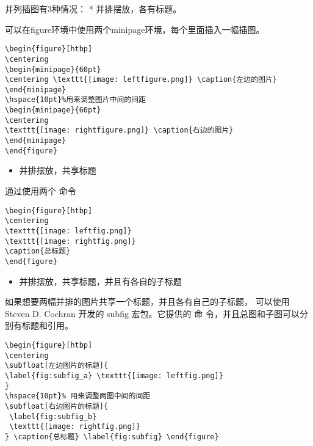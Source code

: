 
并列插图有3种情况： * 并排摆放，各有标题。

可以在figure环境中使用两个minipage环境，每个里面插入一幅插图。

\begin{verbatim}
\begin{figure}[htbp]
\centering
\begin{minipage}{60pt}
\centering \texttt{[image: leftfigure.png]} \caption{左边的图片}
\end{minipage}
\hspace{10pt}%用来调整图片中间的间距
\begin{minipage}{60pt}
\centering
\texttt{[image: rightfigure.png]} \caption{右边的图片}
\end{minipage}
\end{figure}
\end{verbatim}

\begin{itemize}

\item
  并排摆放，共享标题
\end{itemize}

通过使用两个  命令

\begin{verbatim}
\begin{figure}[htbp]
\centering
\texttt{[image: leftfig.png]}
\texttt{[image: rightfig.png]}
\caption{总标题}
\end{figure}
\end{verbatim}

\begin{itemize}

\item
  并排摆放，共享标题，并且有各自的子标题
\end{itemize}

如果想要两幅并排的图片共享一个标题，并且各有自己的子标题， 可以使用
Steven D. Cochran 开发的 subfig 宏包。它提供的  命
令，并且总图和子图可以分别有标题和引用。

\begin{verbatim}
\begin{figure}[htbp]
\centering
\subfloat[左边图片的标题]{
\label{fig:subfig_a} \texttt{[image: leftfig.png]}
}
\hspace{10pt}% 用来调整两图中间的间距
\subfloat[右边图片的标题]{
 \label{fig:subfig_b}
 \texttt{[image: rightfig.png]}
} \caption{总标题} \label{fig:subfig} \end{figure}
\end{verbatim}

